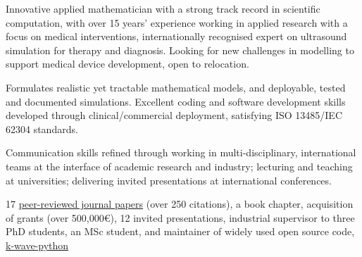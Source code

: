 \documentclass[english, print]{cv-style-wide}
\begin{document}

%
\setul{0.5ex}{0.4pt}%
Innovative applied mathematician with a strong track record in {scientific computation}, with over 15 years' experience working in applied research with a focus on medical interventions, internationally recognised expert on ultrasound simulation for therapy and diagnosis. Looking for new challenges in modelling to support medical device development, open to relocation.
  \begin{NoHyphItemize}
    \item Formulates realistic yet tractable mathematical models, and deployable, tested and documented simulations.  Excellent {coding} and {software development} skills developed through clinical/commercial deployment, satisfying ISO 13485/IEC 62304 standards.  
    \item Communication skills refined through working in multi-disciplinary, international teams at the interface of academic research and industry; lecturing and teaching at universities; delivering invited presentations at international conferences. %
    \item 17 \href{https://scholar.google.co.uk/citations?user=lauJqakAAAAJ&hl=en}{peer-reviewed journal papers} (over 250 citations), a book chapter, acquisition of grants (over 500,000\euro), 12 invited presentations, industrial supervisor to three PhD students, an MSc student, and maintainer of widely used open source code, \href{https://k-wave-python.readthedocs.io/en/latest/index.html#citation}{{k-wave-python}}
  \end{NoHyphItemize}
  
\end{document}
